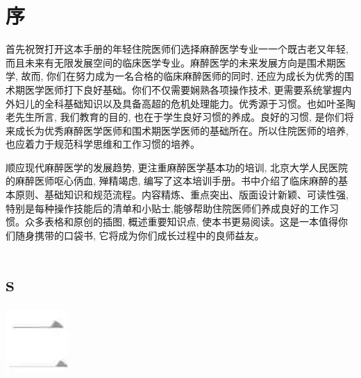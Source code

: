 \documentclass[10pt]{article}
\begin{document}
\section*{序}
首先祝贺打开这本手册的年轻住院医师们选择麻醉医学专业一一个既古老又年轻, 而且未来有无限发展空间的临床医学专业。麻醉医学的未来发展方向是围术期医学, 故而, 你们在努力成为一名合格的临床麻醉医师的同时, 还应为成长为优秀的围术期医学医师打下良好基础。你们不仅需要娴熟各项操作技术, 更需要系统掌握内外妇儿的全科基础知识以及具备高超的危机处理能力。优秀源于习惯。也如叶圣陶老先生所言, 我们教育的目的, 也在于学生良好习惯的养成。良好的习惯, 是你们将来成长为优秀麻醉医学医师和围术期医学医师的基础所在。所以住院医师的培养, 也应着力于规范科学思维和工作习惯的培养。

顺应现代麻醉医学的发展趋势, 更注重麻醉医学基本功的培训, 北京大学人民医院的麻醉医师呕心㑂血, 殚精竭虑, 编写了这本培训手册。书中介绍了临床麻醉的基本原则、基础知识和规范流程。内容精炼、重点突出、版面设计新颖、可读性强, 特别是每种操作技能后的清单和小贴士,能够帮助住院医师们养成良好的工作习惯。众多表格和原创的插图, 概述重要知识点, 使本书更易阅读。这是一本值得你们随身携带的口袋书, 它将成为你们成长过程中的良师益友。

\section*{s}
\begin{center}
\includegraphics[max width=\textwidth]{2024_07_05_645bb794a4d4f32ee0c8g-008}
\end{center}
\end{document}
